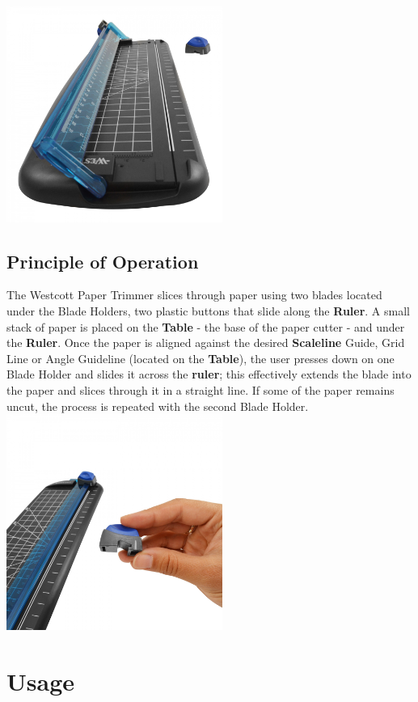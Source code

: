 \documentclass{article}
\begin{document}
\includegraphics[height=200pt]{trimmer0.jpg}

\subsection{Principle of Operation}

The Westcott Paper Trimmer slices through paper using two blades located under the Blade Holders, two plastic buttons that slide along the \textbf{Ruler}. A small stack of paper is placed on the \textbf{Table} - the base of the paper cutter - and under the \textbf{Ruler}.  Once the paper is aligned against the desired \textbf{Scaleline} Guide, Grid Line or Angle Guideline (located on the \textbf{Table}), the user presses down on one Blade Holder and slides it across the \textbf{ruler}; this effectively extends the blade into the paper and slices through it in a straight line. If some of the paper remains uncut, the process is repeated with the second Blade Holder.
\includegraphics[height=200pt]{trimmer1.jpg}

\section{Usage}
\end{document}
